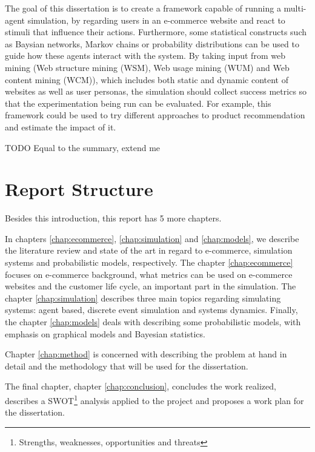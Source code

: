 The goal of this dissertation is to create a framework capable of running a
multi-agent simulation, by regarding users in an e-commerce website and react
to stimuli that influence their actions. Furthermore, some statistical 
constructs such as Baysian networks, Markov chains or probability distributions 
can be used to guide how these agents interact with the system. By taking input 
from web mining (Web structure mining (WSM), Web usage mining (WUM) and
Web content mining (WCM)), which includes both static and dynamic content
of websites as well as user personas, the simulation should collect success 
metrics so that the experimentation being run can be evaluated. For example, 
this framework could be used to try different approaches to product 
recommendation and estimate the impact of it.

TODO Equal to the summary, extend me

\section{Report Structure} \label{sec:struct}

Besides this introduction, this report has 5 more chapters.

In chapters \ref{chap:ecommerce}, \ref{chap:simulation} and \ref{chap:models}, 
we describe the literature review and state of the art in regard to e-commerce, 
simulation systems and probabilistic models, respectively. The chapter 
\ref{chap:ecommerce} focuses on e-commerce background, what metrics can be used 
on e-commerce websites and the customer life cycle, an important part in the 
simulation. The chapter \ref{chap:simulation} describes three main topics 
regarding simulating systems: agent based, discrete event simulation and 
systems dynamics. Finally, the chapter \ref{chap:models} deals with describing 
some probabilistic models, with emphasis on graphical models and Bayesian 
statistics.

Chapter \ref{chap:method} is concerned with describing the problem at hand in 
detail and the methodology that will be used for the dissertation.

The final chapter, chapter \ref{chap:conclusion}, concludes the work realized, 
describes a SWOT\footnote{Strengths, weaknesses, opportunities and threats} 
analysis applied to the project and proposes a work plan for the dissertation.

